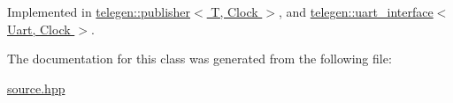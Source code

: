 Implemented in \hyperlink{classtelegen_1_1publisher_abb9ec30f9b0859e34111dc02fe8b52bd}{telegen\+::publisher$<$ T, Clock $>$}, and \hyperlink{classtelegen_1_1uart__interface_a869d06375865913880cf9818150c5b6e}{telegen\+::uart\+\_\+interface$<$ Uart, Clock $>$}.



The documentation for this class was generated from the following file\+:\begin{DoxyCompactItemize}
\item 
\hyperlink{source_8hpp}{source.\+hpp}\end{DoxyCompactItemize}
